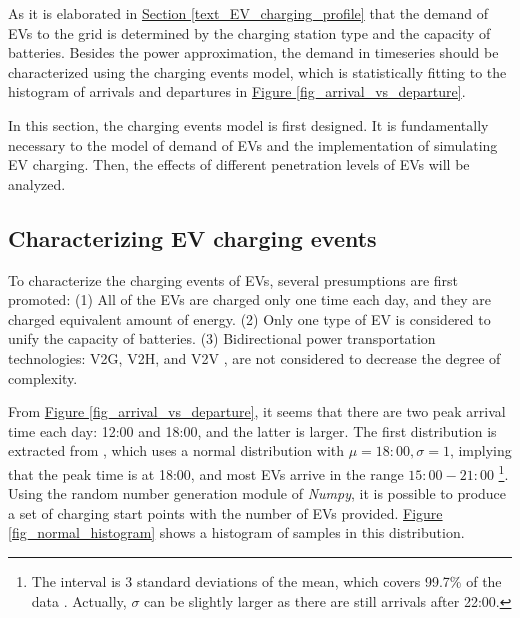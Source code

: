\documentclass[12pt,a4paper]{report}
\begin{document}
            As it is elaborated in \hyperref[text_EV_charging_profile]{Section \ref*{text_EV_charging_profile}} that the demand of EVs to the grid is determined by the charging station type and the capacity of batteries. Besides the power approximation, the demand in timeseries should be characterized using the charging events model, which is statistically fitting to the histogram of arrivals and departures in \hyperref[fig_arrival_vs_departure]{Figure \ref*{fig_arrival_vs_departure}}.

            In this section, the charging events model is first designed. It is fundamentally necessary to the model of demand of EVs and the implementation of simulating EV charging. Then, the effects of different penetration levels of EVs will be analyzed.

                \subsection{Characterizing EV charging events}
                To characterize the charging events of EVs, several presumptions are first promoted: (1) All of the EVs are charged only one time each day, and they are charged equivalent amount of energy. (2) Only one type of EV is considered to unify the capacity of batteries. (3) Bidirectional power transportation technologies: V2G, V2H, and V2V \cite{paper:v2g}, are not considered to decrease the degree of complexity.

                From \hyperref[fig_arrival_vs_departure]{Figure \ref*{fig_arrival_vs_departure}}, it seems that there are two peak arrival time each day: 12:00 and 18:00, and the latter is larger. The first distribution is extracted from \cite{paper:Shao2010}, which uses a normal distribution with $\mu = 18:00, \sigma = 1$, implying that the peak time is at 18:00, and most EVs arrive in the range $15:00 - 21:00$ \footnote{The interval is 3 standard deviations of the mean, which covers 99.7\% of the data \cite{website:normaldistribution}. Actually, $\sigma$ can be slightly larger as there are still arrivals after 22:00.}.
                Using the random number generation module of \emph{Numpy}, it is possible to produce a set of charging start points with the number of EVs provided. \hyperref[fig_normal_histogram]{Figure \ref*{fig_normal_histogram}} shows a histogram of samples in this distribution.
\end{document}
